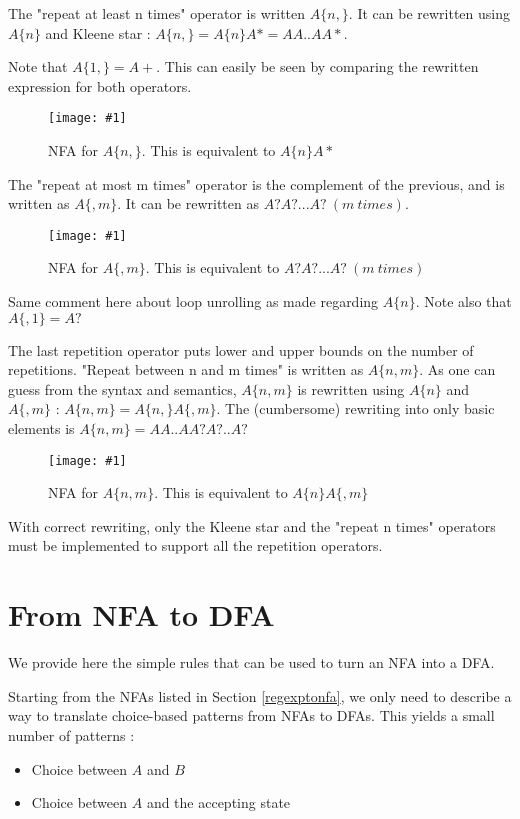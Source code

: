 \documentclass[11pt,a4paper]{report}
\newcommand{\regexp}[1]{$#1$}
\newcommand{\insertfa}[3]{
\begin{figure}[h!]
	\centering
	\texttt{[image: \#1]}
	\caption{#2}
\end{figure}
}
\newcommand{\largenfa}[2]{\insertfa{./img/nfa/#1.png}{NFA for #2}{width=\textwidth}}
\begin{document}
The "repeat at least n times" operator is written \regexp{A\{n,\}}. It can be rewritten using \regexp{A\{n\}} and Kleene star : \regexp{A\{n,\} = A\{n\}A* = AA..AA*}.

Note that \regexp{A\{1,\} = A+}. This can easily be seen by comparing the rewritten expression for both operators.

\largenfa{repeat-at-least-n-times}{\regexp{A\{n,\}}. This is equivalent to \regexp{A\{n\}A*}}

The "repeat at most m times" operator is the complement of the previous, and is written as \regexp{A\{,m\}}. It can be rewritten as \regexp{A?A?...A?\ (m\ times)}.

\largenfa{repeat-at-most-m-times}{\regexp{A\{,m\}}. This is equivalent to \regexp{A?A?...A?\ (m\ times)}}

Same comment here about loop unrolling as made regarding \regexp{A\{n\}}. Note also that \regexp{A\{,1\} = A?}

The last repetition operator puts lower and upper bounds on the number of repetitions. "Repeat between n and m times" is written as \regexp{A\{n, m\}}. As one can guess from the syntax and semantics, \regexp{A\{n, m\}} is rewritten using \regexp{A\{n\}} and \regexp{A\{, m\}} : \regexp{A\{n, m\} = A\{n, \}A\{, m\}}. The (cumbersome) rewriting into only basic elements is \regexp{A\{n, m\} = AA..AA?A?..A?}

\largenfa{repeat-between-n-and-m-times}{\regexp{A\{n,m\}}. This is equivalent to \regexp{A\{n\}A\{,m\}}}

With correct rewriting, only the Kleene star and the "repeat n times" operators must be implemented to support all the repetition operators.

\section{From NFA to DFA}
\label{nfatodfa}

We provide here the simple rules that can be used to turn an NFA into a DFA.

Starting from the NFAs listed in Section \ref{regexptonfa}, we only need to describe a way to translate choice-based patterns from NFAs to DFAs. This yields a small number of patterns :
\begin{itemize}
\item Choice between $A$ and $B$
\item Choice between $A$ and the accepting state
\end{itemize}
\end{document}
